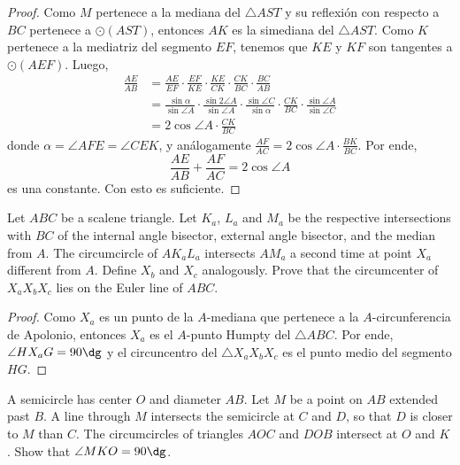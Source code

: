 \begin{proof}
	Como $M$ pertenece a la mediana del $\triangle AST$ y su reflexión con respecto a $BC$ pertenece a $\odot(AST)$, entonces $AK$ es la simediana del $\triangle AST$. Como $K$ pertenece a la mediatriz del segmento $EF$, tenemos que $KE$ y $KF$ son tangentes a $\odot(AEF)$. Luego,
	\begin{align*}
		\frac{AE}{AB}
		&=\frac{AE}{EF}\cdot\frac{EF}{KE}\cdot\frac{KE}{CK}\cdot\frac{CK}{BC}\cdot\frac{BC}{AB}\\
		&=\frac{\sin{\alpha}}{\sin{\angle A}}\cdot\frac{\sin{2\angle A}}{\sin{\angle A}}\cdot\frac{\sin{\angle C}}{\sin{\alpha}}\cdot\frac{CK}{BC}\cdot\frac{\sin{\angle A}}{\sin{\angle C}}\\
		&=2\cos{\angle A}\cdot\frac{CK}{BC}
	\end{align*}
	donde $\alpha=\angle AFE=\angle CEK$, y análogamente $\frac{AF}{AC}=2\cos{\angle A}\cdot\frac{BK}{BC}$. Por ende,
	\[\frac{AE}{AB}+\frac{AF}{AC}=2\cos{\angle A}\]
	es una constante. Con esto es suficiente.
\end{proof}

\begin{probEG}
	Let $ABC$ be a scalene triangle. Let $K_a$, $L_a$ and $M_a$ be the respective intersections with $BC$ of the internal angle bisector, external angle bisector, and the median from $A$. The circumcircle of $AK_aL_a$ intersects $AM_a$ a second time at point $X_a$ different from $A$. Define $X_b$ and $X_c$ analogously. Prove that the circumcenter of $X_aX_bX_c$ lies on the Euler line of $ABC$.
\end{probEG}

\begin{proof}
	Como $X_a$ es un punto de la $A$-mediana que pertenece a la $A$-circunferencia de Apolonio, entonces $X_a$ es el $A$-punto Humpty del $\triangle ABC$. Por ende, $\angle HX_aG=90\dg$ y el circuncentro del $\triangle X_aX_bX_c$ es el punto medio del segmento $HG$.
\end{proof}

\begin{probEG}
	A semicircle has center $O$ and diameter $AB$. Let $M$ be a point on $AB$ extended past $B$. A line through $M$ intersects the semicircle at $C$ and $D$, so that $D$ is closer to $M$ than $C$. The circumcircles of triangles $AOC$ and $DOB$ intersect at $O$ and $K$. Show that $\angle MKO=90\dg$.
\end{probEG}

